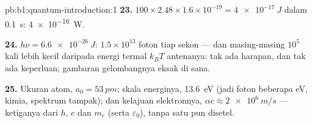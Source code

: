 \begin{solution}{pb:b1:quantum-introduction:1}
\textbf{23.} $100 \times 2.48 \times 1.6 \times 10^{-19} = \qty{4e-17}{J}$ dalam \qty{0.1}{s}:
\qty{4e-16}{W}.

\textbf{24.} $h\nu = \qty{6.6e-26}{J}$: $1.5 \times 10^{13}$ foton tiap sekon ---
dan masing-masing $10^5$ kali lebih kecil daripada energi termal $k_BT$
antenanya: tak ada harapan, dan tak ada keperluan; gambaran gelombangnya eksak di sana.

\textbf{25.} Ukuran atom, $a_0 = \qty{53}{pm}$; skala energinya,
\qty{13.6}{eV} (jadi foton beberapa eV, kimia, spektrum tampak); dan
kelajuan elektronnya, $\alpha c \approx \qty{2e6}{m/s}$ --- ketiganya
dari $h$, $e$ dan $m_e$ (serta $\varepsilon_0$), tanpa satu pun disetel.
\end{solution}
